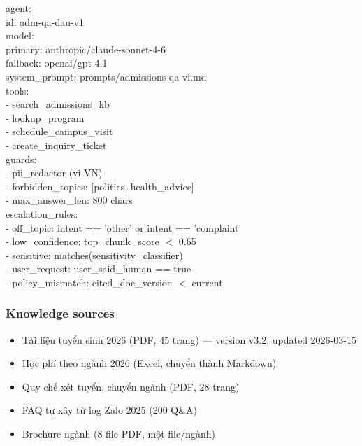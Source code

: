 \documentclass[11pt,a4paper]{article}
\begin{document}
\begin{tcolorbox}[enhanced, colback=codebg, colframe=leaf!40, boxrule=0.5pt,
left=8pt, right=8pt, top=5pt, bottom=5pt, arc=1pt]
\ttfamily\footnotesize
agent:\\
\phantom{xx}id: adm-qa-dau-v1\\
\phantom{xx}model:\\
\phantom{xxxx}primary: anthropic/claude-sonnet-4-6\\
\phantom{xxxx}fallback: openai/gpt-4.1\\
\phantom{xx}system\_prompt: prompts/admissions-qa-vi.md\\
\phantom{xx}tools:\\
\phantom{xxxx}- search\_admissions\_kb\\
\phantom{xxxx}- lookup\_program\\
\phantom{xxxx}- schedule\_campus\_visit\\
\phantom{xxxx}- create\_inquiry\_ticket\\
\phantom{xx}guards:\\
\phantom{xxxx}- pii\_redactor (vi-VN)\\
\phantom{xxxx}- forbidden\_topics: [politics, health\_advice]\\
\phantom{xxxx}- max\_answer\_len: 800 chars\\
\phantom{xx}escalation\_rules:\\
\phantom{xxxx}- off\_topic: intent == 'other' or intent == 'complaint'\\
\phantom{xxxx}- low\_confidence: top\_chunk\_score $<$ 0.65\\
\phantom{xxxx}- sensitive: matches(sensitivity\_classifier)\\
\phantom{xxxx}- user\_request: user\_said\_human == true\\
\phantom{xxxx}- policy\_mismatch: cited\_doc\_version $<$ current
\end{tcolorbox}

\subsubsection*{Knowledge sources}

\begin{itemize}
\item Tài liệu tuyển sinh 2026 (PDF, 45 trang) — version v3.2, updated 2026-03-15
\item Học phí theo ngành 2026 (Excel, chuyển thành Markdown)
\item Quy chế xét tuyển, chuyển ngành (PDF, 28 trang)
\item FAQ tự xây từ log Zalo 2025 (200 Q\&A)
\item Brochure ngành (8 file PDF, một file/ngành)
\end{itemize}
\end{document}

